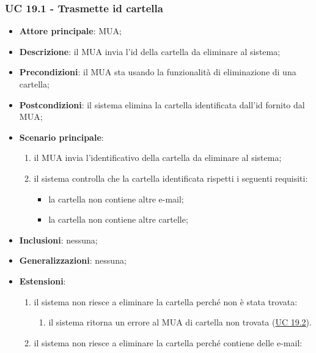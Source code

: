 \subsubsection{UC 19.1 - Trasmette id cartella} \label{sec:UC19.1}
    \begin{itemize}
        \item \textbf{Attore principale}: MUA;
        \item \textbf{Descrizione}: il MUA invia l'id della cartella da eliminare al sistema;
        \item \textbf{Precondizioni}: il MUA sta usando la funzionalità di eliminazione di una cartella;
        \item \textbf{Postcondizioni}: il sistema elimina la cartella identificata dall'id fornito dal MUA;
        \item \textbf{Scenario principale}:
            \begin{enumerate}
                \item il MUA invia l'identificativo della cartella da eliminare al sistema;
                \item il sistema controlla che la cartella identificata rispetti i seguenti requisiti:
                \begin{itemize}
                    \item la cartella non contiene altre e-mail;
                    \item la cartella non contiene altre cartelle;
                \end{itemize}
            \end{enumerate}
        \item \textbf{Inclusioni}: nessuna;
        \item \textbf{Generalizzazioni}: nessuna;
        \item \textbf{Estensioni}:
            \begin{enumerate}[label=\alph*.]
                \item il sistema non riesce a eliminare la cartella perché non è stata trovata:
                \begin{enumerate}[label=\arabic*.]
                    \item il sistema ritorna un errore al MUA di cartella non trovata (\hyperref[sec:UC19.2]{UC 19.2}).
                \end{enumerate}
                \item il sistema non riesce a eliminare la cartella perché contiene delle e-mail:
                \begin{enumerate}[label=\arabic*.]

\end{enumerate}
\end{enumerate}
\end{itemize}
